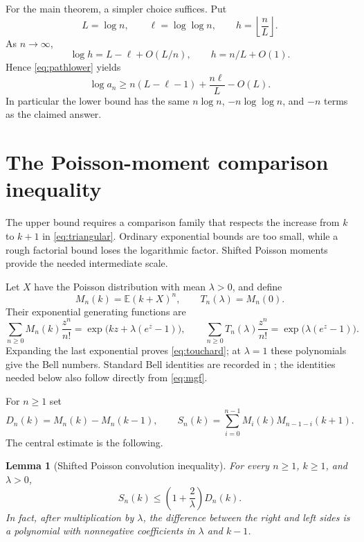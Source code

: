 \documentclass[11pt]{article}
\numberwithin{equation}{section}
\newtheorem{lemma}[theorem]{Lemma}
\theoremstyle{remark}
\newcommand{\E}{\mathbb E}
\begin{document}
For the main theorem, a simpler choice suffices. Put
\[
 L=\log n,\qquad \ell=\log\log n,
 \qquad h=\left\lfloor\frac nL\right\rfloor.
\]
As $n\to\infty$,
\[
 \log h=L-\ell+O(L/n),\qquad h=n/L+O(1).
\]
Hence \eqref{eq:pathlower} yields
\begin{equation}\label{eq:lowerexpanded}
 \log a_n\ge n(L-\ell-1)+\frac{n\ell}{L}-O(L).
\end{equation}
In particular the lower bound has the same $n\log n$, $-n\log\log n$,
and $-n$ terms as the claimed answer.

\section{The Poisson-moment comparison inequality}\label{sec:poisson}

The upper bound requires a comparison family that respects the increase
from $k$ to $k+1$ in \eqref{eq:triangular}. Ordinary exponential bounds
are too small, while a rough factorial bound loses the logarithmic
factor. Shifted Poisson moments provide the needed intermediate scale.

Let $X$ have the Poisson distribution with mean $\lambda>0$, and define
\begin{equation}\label{eq:M}
 M_n(k)=\E(k+X)^n,\qquad T_n(\lambda)=M_n(0).
\end{equation}
Their exponential generating functions are
\begin{equation}\label{eq:mgf}
 \sum_{n\ge0}M_n(k)\frac{z^n}{n!}
 =\exp\!\bigl(kz+\lambda(e^z-1)\bigr),
 \qquad
 \sum_{n\ge0}T_n(\lambda)\frac{z^n}{n!}
 =\exp\!\bigl(\lambda(e^z-1)\bigr).
\end{equation}
Expanding the last exponential proves \eqref{eq:touchard}; at
$\lambda=1$ these polynomials give the Bell numbers. Standard Bell
identities are recorded in \cite{dlmf-bell}; the identities needed below
also follow directly from \eqref{eq:mgf}.

For $n\ge1$ set
\begin{equation}\label{eq:DS}
 D_n(k)=M_n(k)-M_n(k-1),\qquad
 S_n(k)=\sum_{i=0}^{n-1}M_i(k)M_{n-1-i}(k+1).
\end{equation}
The central estimate is the following.

\begin{lemma}[Shifted Poisson convolution inequality]\label{lem:poisson}
For every $n\ge1$, $k\ge1$, and $\lambda>0$,
\begin{equation}\label{eq:poissonineq}
 S_n(k)\le\left(1+\frac2\lambda\right)D_n(k).
\end{equation}
In fact, after multiplication by $\lambda$, the difference between the
right and left sides is a polynomial with nonnegative coefficients in
$\lambda$ and $k-1$.
\end{lemma}
\end{document}
